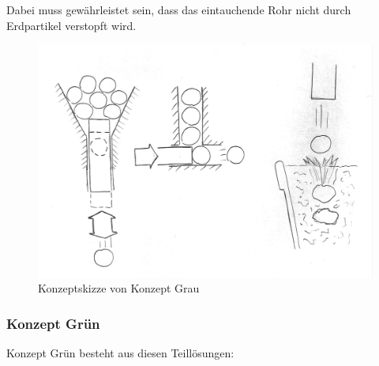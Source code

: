 Dabei muss gewährleistet sein, dass das eintauchende Rohr nicht durch Erdpartikel verstopft wird.
\begin{figure}[H]
	\includegraphics[scale=0.6]{Illustrationen/5-Konzept/grau_Konzept.jpg}
	\caption{Konzeptskizze von Konzept Grau}
	\label{fig:konzept_grau}
\end{figure}

\subsubsection{Konzept Grün}
\label{KonzeptGreen}
Konzept Grün besteht aus diesen Teillösungen:
\newline


